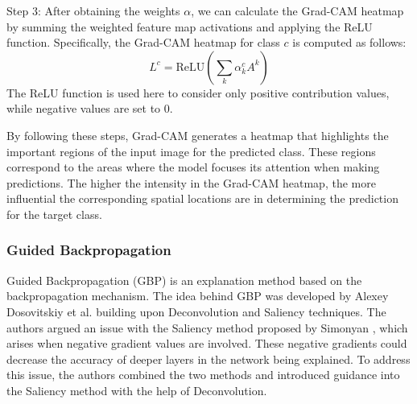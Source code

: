 Step 3: After obtaining the weights $\alpha$, we can calculate the Grad-CAM heatmap by summing the weighted feature map activations and applying the ReLU function. Specifically, the Grad-CAM heatmap for class $c$ is computed as follows:
\begin{equation}
L^c = \text{ReLU}\left(\sum_k{\alpha_k^c A^k}\right)
\end{equation}
%
The ReLU function is used here to consider only positive contribution values, while negative values are set to 0.

By following these steps, Grad-CAM generates a heatmap that highlights the important regions of the input image for the predicted class. These regions correspond to the areas where the model focuses its attention when making predictions. The higher the intensity in the Grad-CAM heatmap, the more influential the corresponding spatial locations are in determining the prediction for the target class.

\subsubsection{Guided Backpropagation}
\label{subsubsec:GBP}

Guided Backpropagation (GBP) \cite{guidedbackprop} is an explanation method based on the backpropagation mechanism. The idea behind GBP was developed by Alexey Dosovitskiy et al. building upon Deconvolution \cite{deconv} and Saliency \cite{saliencyMaps} techniques. The authors argued an issue with the Saliency method proposed by Simonyan \cite{saliencyMaps}, which arises when negative gradient values are involved. These negative gradients could decrease the accuracy of deeper layers in the network being explained. To address this issue, the authors combined the two methods and introduced guidance into the Saliency method with the help of Deconvolution.

